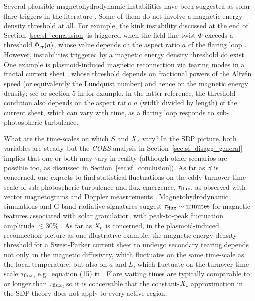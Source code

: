 \begin{subappendices}
Several plausible magnetohydrodynamic instabilities have been suggested as solar flare triggers in the literature \citep{Ji2011}. Some of them do not involve a magnetic energy density threshold at all. For example, the kink instability discussed at the end of Section~\ref{sec:sf_conclusion} is triggered when the field-line twist $\Phi$ exceeds a threshold $\Phi_{\rm cr}(a)$, whose value depends on the aspect ratio $a$ of the flaring loop \citep{Torok2004}. However, instabilities triggered by a magnetic energy density threshold do exist. One example is plasmoid-induced magnetic reconnection via tearing modes in a fractal current sheet \citep{Shibata2001}, whose threshold depends on fractional powers of the Alfv\'{e}n speed (or equivalently the Lundquist number) and hence on the magnetic energy density; see \citet{Ji2011} or section 5 in \citet{Shibata2001} for example. In the latter reference, the threshold condition also depends on the aspect ratio $a$ (width divided by length) of the current sheet, which can vary with time, as a flaring loop responds to sub-photospheric turbulence.

What are the time-scales on which $S$ and $X_\textrm{c}$ vary? In the SDP picture, both variables are steady, but the \emph{GOES} analysis in Section~\ref{sec:sf_disagg_general} implies that one or both may vary in reality (although other scenarios are possible too, as discussed in Section~\ref{sec:sf_conclusion}). As far as $S$ is concerned, one expects to find statistical fluctuations on the eddy turnover time-scale of sub-photospheric turbulence and flux emergence, $\tau_{\rm flux}$, as observed with vector magnetograms and Doppler measurements \citep{Fisher2012}. Magnetohydrodynamic simulations and G-band radiative signatures suggest $\tau_{\rm flux} \sim {\rm minutes}$ for magnetic features associated with solar granulation, with peak-to-peak fluctuation amplitude $\lesssim 30\%$ \citep{Keys2011, Shelyag2011, Shelyag2011a}. As far as $X_\textrm{c}$ is concerned, in the plasmoid-induced reconnection picture as one illustrative example, the magnetic energy density threshold for a Sweet-Parker current sheet to undergo secondary tearing depends not only on the magnetic diffusivity, which fluctuates on the same time-scale as the local temperature, but also on $a$ and $L$, which fluctuate on the turnover time-scale $\tau_{\rm flux}$, e.g.~equation (15) in \citep{Shibata2001}. Flare waiting times are typically comparable to or longer than $\tau_{\rm flux}$, so it is conceivable that the constant-$X_\textrm{c}$ approximation in the SDP theory does not apply to every active region.


\end{subappendices}
